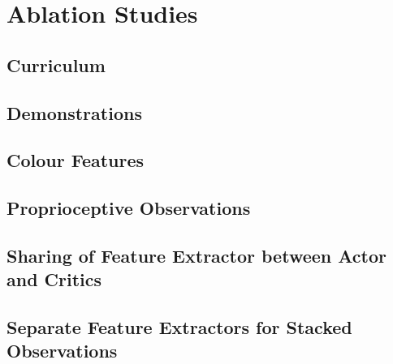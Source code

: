 \section{Ablation Studies}

\subsection{Curriculum}

\subsection{Demonstrations}

\subsection{Colour Features}

\subsection{Proprioceptive Observations}

\subsection{Sharing of Feature Extractor between Actor and Critics}

\subsection{Separate Feature Extractors for Stacked Observations}

